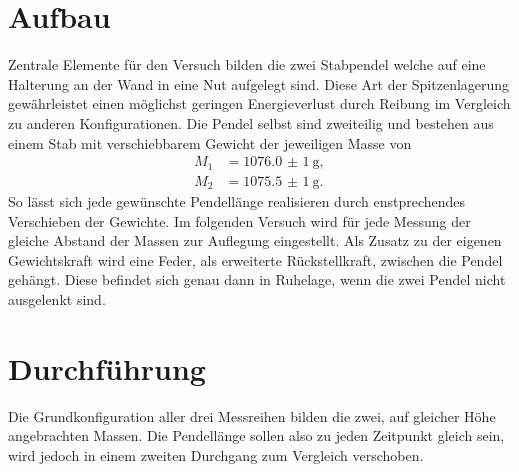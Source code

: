 \newpage
\section{Aufbau}
Zentrale Elemente für den Versuch bilden die zwei Stabpendel welche auf eine Halterung an der Wand in eine Nut aufgelegt sind.
Diese Art der Spitzenlagerung gewährleistet einen möglichst geringen Energieverlust durch Reibung im Vergleich zu anderen Konfigurationen. 
Die Pendel selbst sind zweiteilig und bestehen aus einem Stab mit verschiebbarem Gewicht der jeweiligen Masse von 
\begin{align*}
    M_1 &= \SI{1076,0(1)}{\g}, \\
    M_2 &= \SI{1075,5(1)}{\g}.
\end{align*}
So lässt sich jede gewünschte Pendellänge realisieren durch enstprechendes Verschieben der Gewichte. Im folgenden Versuch wird 
für jede Messung der gleiche Abstand der Massen zur Auflegung eingestellt.
Als Zusatz zu der eigenen Gewichtskraft wird eine Feder, als erweiterte Rückstellkraft, zwischen die Pendel gehängt. 
Diese befindet sich genau dann in Ruhelage, wenn die zwei Pendel nicht ausgelenkt sind. 

\section{Durchführung}
Die Grundkonfiguration aller drei Messreihen bilden die zwei, auf gleicher Höhe angebrachten Massen. Die Pendellänge sollen also zu jeden Zeitpunkt
gleich sein, wird jedoch in einem zweiten Durchgang zum Vergleich verschoben.




